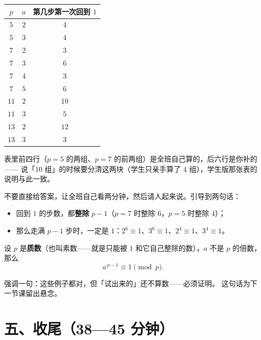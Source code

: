 \begin{center}
\begin{tabular}{@{}ccc@{}}
  \toprule
  \(p\) & \(a\) & 第几步第一次回到 \(1\) \\
  \midrule
  \(5\) & \(2\) & \(4\) \\
  \(5\) & \(3\) & \(4\) \\
  \(7\) & \(2\) & \(3\) \\
  \(7\) & \(3\) & \(6\) \\
  \(7\) & \(4\) & \(3\) \\
  \(7\) & \(5\) & \(6\) \\
  \(11\) & \(2\) & \(10\) \\
  \(11\) & \(3\) & \(5\) \\
  \(13\) & \(2\) & \(12\) \\
  \(13\) & \(3\) & \(3\) \\
  \bottomrule
\end{tabular}
\end{center}

表里前四行（\(p=5\) 的两组、\(p=7\) 的前两组）是全班自己算的，后六行是你补的——
说「\(10\) 组」的时候要分清这两块（学生只亲手算了 \(4\) 组），学生版那张表的说明与此一致。

\begin{caozuo}
  不要直接给答案，让全班自己看两分钟，然后请人起来说。引导到两句话：
  \begin{itemize}
    \item 回到 \(1\) 的步数，都\textbf{整除} \(p-1\)（\(p=7\) 时整除 \(6\)，\(p=5\) 时整除 \(4\)）；
    \item 那么走满 \(p-1\) 步时，一定是 \(1\)：\(2^6\equiv1\)、\(3^6\equiv1\)、\(2^4\equiv1\)、\(3^4\equiv1\)。
  \end{itemize}
\end{caozuo}

\begin{dingli}[猜想]
  设 \(p\) 是\textbf{质数}（也叫素数——就是只能被 \(1\) 和它自己整除的数），\(a\) 不是 \(p\) 的倍数，那么
  \[
    a^{\,p-1}\equiv1 \pmod p .
  \]
\end{dingli}

\begin{zhu}
  强调一句：这些例子都对，但「试出来的」还不算数——必须证明。
  这句话为下一节课留出悬念。
\end{zhu}

\section*{五、收尾（38—45 分钟）}

